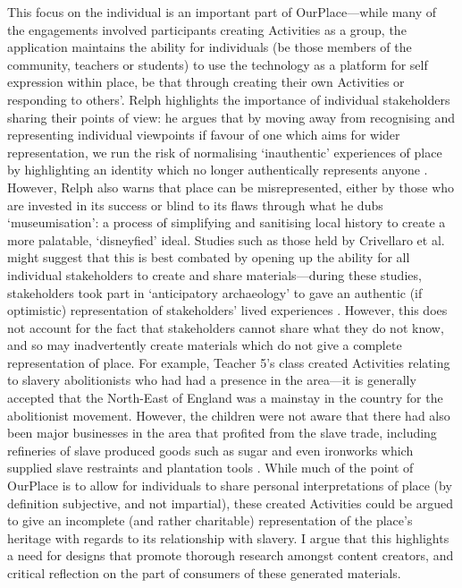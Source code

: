 This focus on the individual is an important part of OurPlace---while many of the engagements involved participants creating Activities as a group, the application maintains the ability for individuals (be those members of the community, teachers or students) to use the technology as a platform for self expression within place, be that through creating their own Activities or responding to others'. Relph highlights the importance of individual stakeholders sharing their points of view: he argues that by moving away from recognising and representing individual viewpoints if favour of one which aims for wider representation, we run the risk of normalising `inauthentic' experiences of place by highlighting an identity which no longer authentically represents anyone \citep{Relph1976}. However, Relph also warns that place can be misrepresented, either by those who are invested in its success or blind to its flaws through what he dubs `museumisation': a process of simplifying and sanitising local history to create a more palatable, `disneyfied' ideal. Studies such as those held by Crivellaro et al. might suggest that this is best combated by opening up the ability for all individual stakeholders to create and share materials---during these studies, stakeholders took part in `anticipatory archaeology' to gave an authentic (if optimistic) representation of stakeholders' lived experiences \citep{Crivellaro2016}. However, this does not account for the fact that stakeholders cannot share what they do not know, and so may inadvertently create materials which do not give a complete representation of place. For example, Teacher 5's class created Activities relating to slavery abolitionists who had had a presence in the area---it is generally accepted that the North-East of England was a mainstay in the country for the abolitionist movement. However, the children were not aware that there had also been major businesses in the area that profited from the slave trade, including refineries of slave produced goods such as sugar and even ironworks which supplied slave restraints and plantation tools \citep{LitPhil2007}. While much of the point of OurPlace is to allow for individuals to share personal interpretations of place (by definition subjective, and not impartial), these created Activities could be argued to give an incomplete (and rather charitable) representation of the place's heritage with regards to its relationship with slavery. I argue that this highlights a need for designs that promote thorough research amongst content creators, and critical reflection on the part of consumers of these generated materials.

